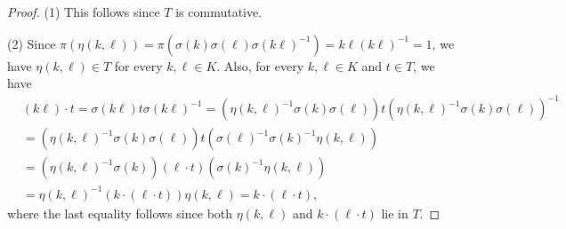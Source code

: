 \documentclass{amsart}
\theoremstyle{definition}
\numberwithin{equation}{section}
\begin{document}
\begin{proof}
(1) This follows since $T$ is commutative.

(2) Since $\pi(\eta(k,\ell))=\pi(\sigma(k)\sigma(\ell)\sigma(k\ell)^{-1})=k\ell(k\ell)^{-1}=1$, we have $\eta(k,\ell)\in T$ for every $k,\ell\in K$. Also, for every $k,\ell\in K$ and $t\in T$, we have
\begin{equation*}
\begin{split}
& (k\ell)\cdot t=\sigma(k\ell)t\sigma(k\ell)^{-1}=\left(\eta(k,\ell)^{-1}\sigma(k)\sigma(\ell)\right)t\left(\eta(k,\ell)^{-1}\sigma(k)\sigma(\ell)\right)^{-1}\\
&=\left(\eta(k,\ell)^{-1}\sigma(k)\sigma(\ell)\right)t\left(\sigma(\ell)^{-1}\sigma(k)^{-1} \eta(k,\ell)\right)\\
&=\left(\eta(k,\ell)^{-1}\sigma(k)\right)(\ell \cdot t)\left(\sigma(k)^{-1} \eta(k,\ell)\right)\\
&=\eta(k,\ell)^{-1}\left(k\cdot (\ell \cdot t)\right)\eta(k,\ell)=k\cdot (\ell \cdot t),
\end{split}
\end{equation*}
where the last equality follows since both $\eta(k,\ell)$ and $k\cdot (\ell \cdot t)$ lie in $T$.


\end{proof}
\end{document}
